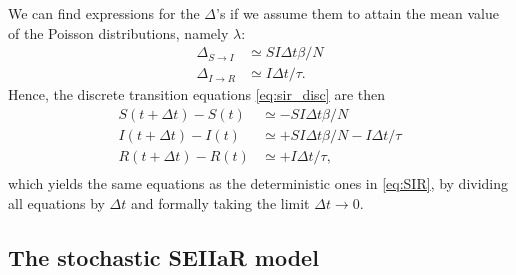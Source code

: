 We can find expressions for the $\Delta$'s if we assume them to attain the mean value of the Poisson distributions, namely $\lambda$:
\begin{subequations}
	\begin{align}
		\Delta_{S\to I} &\simeq SI \Delta t \beta/N  \\
		\Delta_{I\to R} &\simeq I \Delta t/\tau.
	\end{align}
\end{subequations}
Hence, the discrete transition equations \eqref{eq:sir_disc} are then  
\begin{subequations}
	\begin{align}
		S(t + \Delta t) - S(t) &\simeq  - SI \Delta t \beta/N\\
		I(t + \Delta t) - I(t)&\simeq  + SI \Delta t \beta/N - I \Delta t/\tau \\
		R(t + \Delta t) -  R(t)&\simeq + I \Delta t/\tau, \\
	\end{align}
\end{subequations}
which yields the same equations as the deterministic ones in \eqref{eq:SIR}, by dividing all equations by $\Delta t$ and formally taking the limit $\Delta t \to 0$.

\subsection{The stochastic SEIIaR model}

